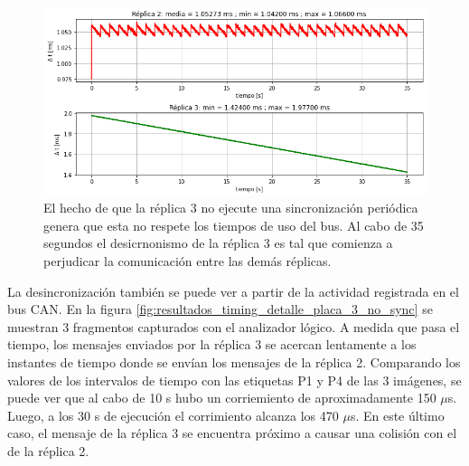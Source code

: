 \begin{figure}[htb]
    \centering
    \includegraphics[width=\textwidth]{img/resultados_no_sync.png}
    \caption{El hecho de que la réplica 3 no ejecute una sincronización periódica genera que esta no respete los tiempos de uso del bus. Al cabo de 35 segundos el desicrnonismo de la réplica 3 es tal que comienza a perjudicar la comunicación entre las demás réplicas.}
    \label{fig:resultados_no_sync}
\end{figure}

La desincronización también se puede ver a partir de la actividad registrada en el bus CAN. En la figura \ref{fig:resultados_timing_detalle_placa_3_no_sync} se muestran 3 fragmentos capturados con el analizador lógico. A medida que pasa el tiempo, los mensajes enviados por la réplica 3 se acercan lentamente a los instantes de tiempo donde se envían los mensajes de la réplica 2. Comparando los valores de los intervalos de tiempo con las etiquetas P1 y P4 de las 3 imágenes, se puede ver que al cabo de 10 s hubo un corriemiento de aproximadamente 150 $\mu$s. Luego, a los 30 s de ejecución el corrimiento alcanza los 470 $\mu$s. En este último caso, el mensaje de la réplica 3 se encuentra próximo a causar una colisión con el de la réplica 2.

